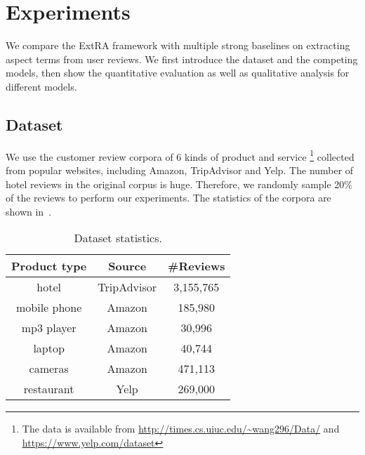 \section{Experiments}
\label{sec:experiments}
We compare the ExtRA framework with 
multiple strong baselines on extracting aspect terms from user reviews. 
We first introduce the dataset and the competing models, then
show the quantitative evaluation as well as qualitative analysis for
different models.

\subsection{Dataset}
\label{sec:dataset}
We use the customer review corpora of 6 kinds of product and service
\footnote{The data is available from
\url{http://times.cs.uiuc.edu/~wang296/Data/} and 
\url{https://www.yelp.com/dataset}} collected from popular websites, 
including Amazon, TripAdvisor and Yelp. 
The number of hotel reviews \cite{Wang2011LearningOD} in the original
corpus is huge. 
Therefore, we randomly sample 20\% of the reviews to perform our experiments.
The statistics of the corpora are shown in~.

\begin{table}[th!]
\small
\centering
\vspace{-0.3cm}
\caption{Dataset statistics.} 
\label{table:dataset}
\vspace{-0.2cm}
\begin{tabular}{|c|c|c|}
\hline
\textbf{Product type} & \textbf{Source} & \textbf{\#Reviews} \\ \hline \hline
hotel        & TripAdvisor & 3,155,765   \\\hline
mobile phone & Amazon & 185,980  \\\hline
mp3 player   & Amazon & 30,996   \\\hline
laptop       & Amazon & 40,744   \\\hline
cameras & Amazon & 471,113  \\\hline
restaurant   & Yelp & 269,000   \\\hline
\end{tabular}
\vspace{-0.2cm}
\end{table}

